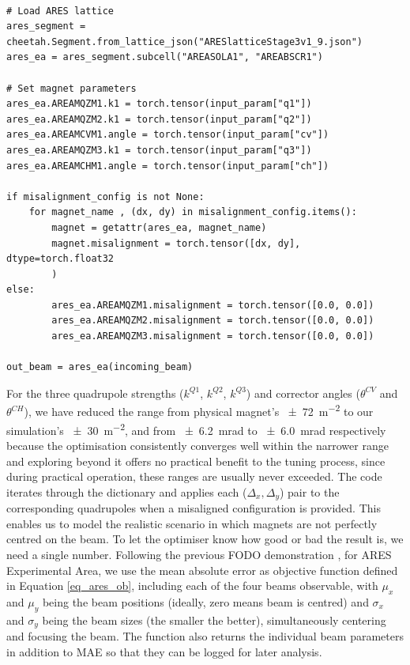 \begin{lstlisting}[caption={ARES lattice loading and magnet parameters configuration.}, label={code:ares_loading}]

# Load ARES lattice
ares_segment = cheetah.Segment.from_lattice_json("ARESlatticeStage3v1_9.json")
ares_ea = ares_segment.subcell("AREASOLA1", "AREABSCR1")

# Set magnet parameters
ares_ea.AREAMQZM1.k1 = torch.tensor(input_param["q1"])
ares_ea.AREAMQZM2.k1 = torch.tensor(input_param["q2"])
ares_ea.AREAMCVM1.angle = torch.tensor(input_param["cv"])
ares_ea.AREAMQZM3.k1 = torch.tensor(input_param["q3"])
ares_ea.AREAMCHM1.angle = torch.tensor(input_param["ch"])

if misalignment_config is not None: 
    for magnet_name , (dx, dy) in misalignment_config.items():
        magnet = getattr(ares_ea, magnet_name)
        magnet.misalignment = torch.tensor([dx, dy], dtype=torch.float32
        )
else:
        ares_ea.AREAMQZM1.misalignment = torch.tensor([0.0, 0.0])
        ares_ea.AREAMQZM2.misalignment = torch.tensor([0.0, 0.0])
        ares_ea.AREAMQZM3.misalignment = torch.tensor([0.0, 0.0])

out_beam = ares_ea(incoming_beam)
\end{lstlisting}

For the three quadrupole strengths ($k^{Q1}$, $k^{Q2}$, $k^{Q3}$) and corrector angles ($\theta^{CV}$ and $\theta^{CH}$), we have reduced the range from physical magnet's 
\SI{\pm72}{m^{-2}} to our simulation's \SI{\pm30}{m^{-2}}, and from \SI{\pm6.2}{mrad} to \SI{\pm6.0}{mrad} respectively because the optimisation consistently converges well within the narrower range
and exploring beyond it offers no practical benefit to the tuning process, since during practical operation, these ranges are usually never exceeded. The code iterates through the dictionary and applies each ($\Delta_x, \Delta_y$) pair to the corresponding 
quadrupoles when a misaligned configuration is provided. This enables us to model the realistic scenario in which magnets are not perfectly 
centred on the beam. To let the optimiser know how good or bad the result is, we need a single number. Following the previous FODO demonstration \cite{kaiser2024bridging}, for ARES Experimental Area, we use the mean absolute error as objective function defined in Equation \ref{eq_ares_ob}, including each of the four beams observable, with $\mu_x$ and $\mu_y$ being the beam positions (ideally, zero means beam is centred) and $\sigma_x$ and $\sigma_y$ being the beam sizes (the smaller the better), simultaneously centering and focusing the beam. The function also returns the individual beam parameters in addition to MAE so that they can be logged for later analysis.

